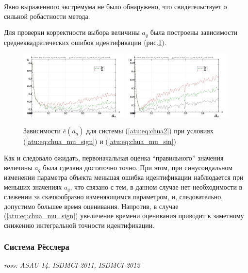 \documentclass[a4paper,12pt]{article}
\newcommand{\LinkRef}[1]{ \textit{#1} }
\begin{document}
Явно выраженного экстремума не было обнаружено, что свидетельствует
о сильной робастности метода.

Для проверки корректности выбора величины $a_q$ была построены зависимости
среднеквадратических ошибок идентификации (рис.\ref{atu:f:chua_e_a_q}).


\begin{figure}[htb!]
\centerline{
  \includegraphics[width=0.49\textwidth]{p/cha/chua/chua_m5p-p_a_q_e_sign.png}
  \includegraphics[width=0.49\textwidth]{p/cha/chua/chua_m5p-p_a_q_e_sin.png}
}
  \caption{Зависимости  $\bar{e}(a_q)$ для системы (\ref{atu:eq:chua2})
  при условиях (\ref{atu:eq:chua_mu_sign}) и (\ref{atu:eq:chua_mu_sin})
}
\label{atu:f:chua_e_a_q}
\end{figure}

Как и следовало ожидать, первоначальная оценка ``правильного'' значения величины $a_q$
была сделана достаточно точно. При этом, при синусоидальном изменении параметра объекта
меньшая ошибка идентификации наблюдается при меньших значениях $a_q$, что связано
с тем, в данном случае нет необходимости в слежении за скачкообразно изменяющимся параметром,
и, следовательно, допустимо большее время оценивания. Напротив, в случае (\ref{atu:eq:chua_mu_sign})
увеличение времени оценивания приводит к заметному снижению интегральной точности идентификации.



\FloatBarrier
\subsubsection{Система Рёсслера} %

\LinkRef{
  ross: ASAU-14. ISDMCI-2011, ISDMCI-2012
}
\end{document}
